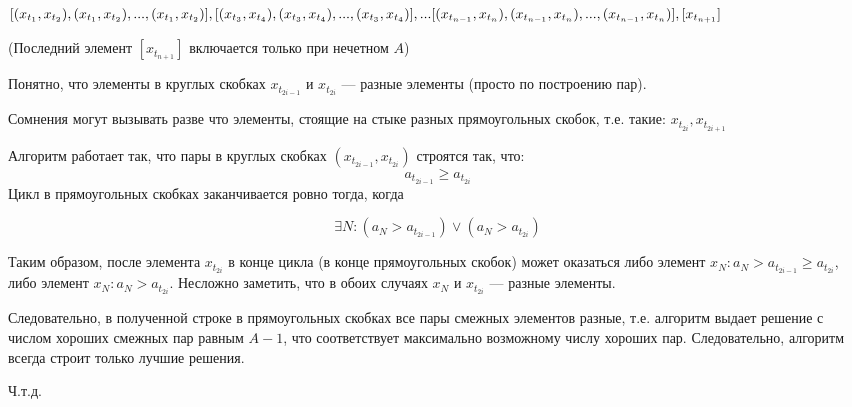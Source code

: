 \documentclass{article}
\begin{document}
$
[(x_{t_1}, x_{t_2}), (x_{t_1}, x_{t_2}), ..., (x_{t_1}, x_{t_2})], 
[(x_{t_3}, x_{t_4}), (x_{t_3}, x_{t_4}), ..., (x_{t_3}, x_{t_4})], ...
\newline
[(x_{t_{n-1}}, x_{t_n}), (x_{t_{n-1}}, x_{t_n}), ..., (x_{t_{n-1}}, x_{t_n})], [x_{t_{n+1}}]
$

(Последний элемент \([x_{t_{n+1}}]\) включается только при нечетном \(A\))

Понятно, что элементы в круглых скобках \(x_{t_{2i-1}}\) и \(x_{t_{2i}}\) --- разные элементы (просто по построению пар).

Сомнения могут вызывать разве что элементы, стоящие на стыке разных прямоугольных скобок, т.е. такие: \( x_{t_{2i}}, x_{t_{2i+1}} \)

Алгоритм работает так, что пары в круглых скобках \( (x_{t_{2i-1}}, x_{t_{2i}}) \) строятся так, что:
\[ a_{t_{2i-1}} \ge a_{t_{2i}} \]
Цикл в прямоугольных скобках заканчивается ровно тогда, когда

\[
\exists N : (a_N > a_{t_{2i-1}}) \vee (a_N > a_{t_{2i}})
\]

Таким образом, после элемента \(x_{t_{2i}}\) в конце цикла (в конце прямоугольных скобок) может оказаться либо элемент 
\(x_N : a_N > a_{t_{2i-1}} \ge a_{t_{2i}} \), либо элемент 
\(x_N : a_N > a_{t_{2i}}\).
 Несложно заметить, что в обоих случаях 
\( x_N \) и \(x_{t_{2i}}\) --- разные элементы.

Следовательно, в полученной строке в прямоугольных скобках все пары смежных элементов разные, т.е. алгоритм выдает решение с числом хороших смежных пар равным \(A-1\), что соответствует максимально возможному числу хороших пар. Следовательно, алгоритм всегда строит только лучшие решения.

Ч.т.д.
   
 
\end{document}
